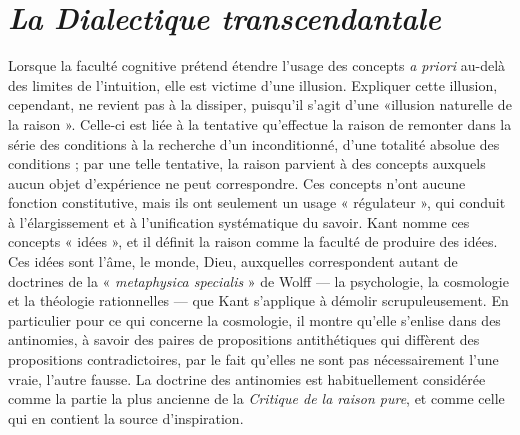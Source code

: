
\section{{\it La Dialectique transcendantale}}


Lorsque la faculté cognitive prétend
étendre l’usage des concepts {\it a priori} au-delà
des limites de l’intuition, elle est victime
d’une illusion. Expliquer cette illusion,
cependant, ne revient pas à la
dissiper, puisqu'il s’agit d’une «illusion
naturelle de la raison ». Celle-ci est liée à
la tentative qu’effectue la raison de
remonter dans la série des conditions à la
recherche d’un inconditionné, d’une totalité
absolue des conditions ; par une telle
tentative, la raison parvient à des
concepts auxquels aucun objet d’expérience
ne peut correspondre. Ces
concepts n’ont aucune fonction constitutive,
mais ils ont seulement un usage « régulateur »,
qui conduit à l’élargissement
et à l’unification systématique du savoir.
Kant nomme ces concepts « idées », et il
définit la raison comme la faculté de produire
des idées. Ces idées sont l’âme, le
monde, Dieu, auxquelles correspondent
autant de doctrines de la « {\it metaphysica
specialis} » de Wolff — la psychologie, la
cosmologie et la théologie rationnelles —
que Kant s’applique à démolir scrupuleusement.
En particulier pour ce qui
concerne la cosmologie, il montre qu’elle
s’enlise dans des antinomies, à savoir des
paires de propositions antithétiques qui
diffèrent des propositions contradictoires,
par le fait qu’elles ne sont pas nécessairement
l’une vraie, l’autre fausse. La doctrine
des antinomies est habituellement
considérée comme la partie la plus
ancienne de la {\it Critique de la raison pure},
et comme celle qui en contient la source
d'inspiration.
